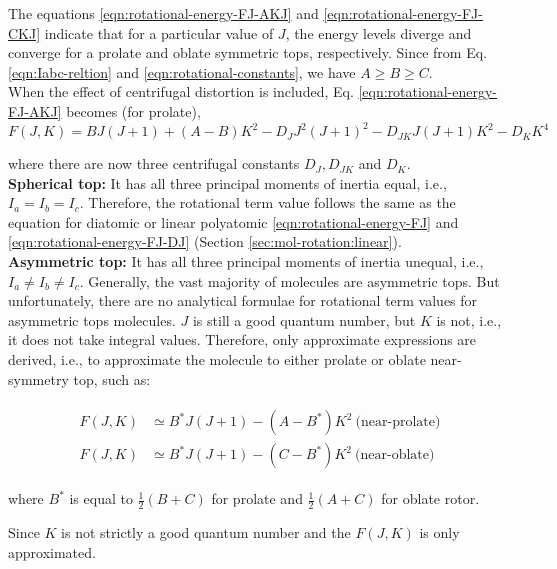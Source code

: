 The equations \ref{eqn:rotational-energy-FJ-AKJ} and \ref{eqn:rotational-energy-FJ-CKJ} indicate that for a particular value of $J$, the energy levels diverge and converge for a prolate and oblate symmetric tops, respectively. Since from Eq. \ref{eqn:Iabc-reltion} and \ref{eqn:rotational-constants}, we have $A \geq B \geq C$.\\

When the effect of centrifugal distortion is included, Eq. \ref{eqn:rotational-energy-FJ-AKJ} becomes (for prolate),
\begin{equation}
    \label{eqn:rotational-energy-FJ-KJ}
    F(J, K) = BJ(J+1) + (A-B)K^2 - D_J J^2(J+1)^2 - D_{JK} J(J+1)K^2 - D_K K^4
\end{equation}

where there are now three centrifugal constants $D_J, D_{JK}$ and $D_K$.\\

\textbf{Spherical top: }It has all three principal moments of inertia equal, i.e., $I_a = I_b = I_c$. Therefore, the rotational term value follows the same as the equation for diatomic or linear polyatomic \ref{eqn:rotational-energy-FJ} and \ref{eqn:rotational-energy-FJ-DJ} (Section \ref{sec:mol-rotation:linear}).\\

\textbf{Asymmetric top: } It has all three principal moments of inertia unequal, i.e., $I_a \neq I_b \neq I_c $. Generally, the vast majority of molecules are asymmetric tops. But unfortunately, there are no analytical formulae for rotational term values for asymmetric tops molecules. $J$ is still a good quantum number, but $K$ is not, i.e., it does not take integral values. Therefore, only approximate expressions are derived, i.e., to approximate the molecule to either prolate or oblate near-symmetry top, such as:

\begin{align*}
    \begin{split}
        F(J, K) &\simeq B^* J(J+1) - (A-B^*)K^2\ \text{(near-prolate)} \\
        F(J, K) &\simeq B^* J(J+1) - (C-B^*)K^2\ \text{(near-oblate)}
    \end{split}
\end{align*}

where $B^*$ is equal to $\frac{1}{2} (B+C)$ for prolate and $\frac{1}{2} (A+C)$ for oblate rotor.

Since $K$ is not strictly a good quantum number and the $F(J, K)$ is only approximated.

